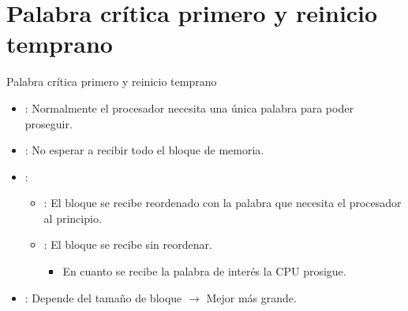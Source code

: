\section{Palabra crítica primero y reinicio temprano}

\begin{frame}[t]{Palabra crítica primero y reinicio temprano}
\begin{itemize}
  \item {}: 
        Normalmente el procesador necesita una única palabra para poder proseguir.

  \item {}: 
        No esperar a recibir todo el bloque de memoria.

  \item {}:
    \begin{itemize}
      \item {}: 
            El bloque se recibe reordenado con la palabra que 
            necesita el procesador al principio.

      \item {}: 
            El bloque se recibe sin reordenar.
        \begin{itemize}
          \item En cuanto se recibe la palabra de interés la CPU prosigue.
        \end{itemize}
    \end{itemize}

  \item {}:
        Depende del tamaño de bloque $\rightarrow$ Mejor más grande.


\end{itemize}
\end{frame}
